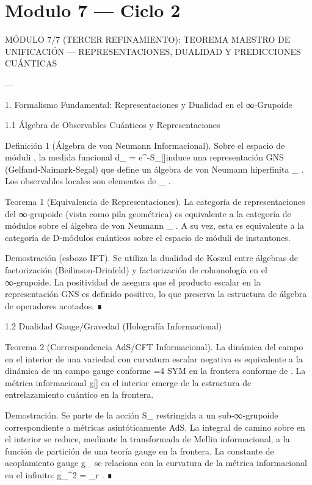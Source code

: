 \documentclass[12pt,twoside]{book}
\begin{document}
\chapter{Modulo 7 — Ciclo 2}


MÓDULO 7/7 (TERCER REFINAMIENTO): TEOREMA MAESTRO DE UNIFICACIÓN — REPRESENTACIONES, DUALIDAD Y PREDICCIONES CUÁNTICAS

---

1. Formalismo Fundamental: Representaciones y Dualidad en el ∞‑Grupoide

1.1 Álgebra de Observables Cuánticos y Representaciones

Definición 1 (Álgebra de von Neumann Informacional). Sobre el espacio de móduli   , la medida funcional  d\mu_{} = e^{-S_{}[\rho]}\rho  induce una representación GNS (Gelfand‑Naimark‑Segal) que define un álgebra de von Neumann hiperfinita  _{} . Los observables locales son elementos de  _{} .

Teorema 1 (Equivalencia de Representaciones). La categoría de representaciones del ∞‑grupoide    (vista como pila geométrica) es equivalente a la categoría de módulos sobre el álgebra de von Neumann  _{} . A su vez, esta es equivalente a la categoría de D‑módulos cuánticos sobre el espacio de móduli de instantones.

Demostración (esbozo IFT). Se utiliza la dualidad de Koszul entre álgebras de factorización (Beilinson‑Drinfeld) y factorización de cohomología en el ∞‑grupoide. La positividad de  \rho  asegura que el producto escalar en la representación GNS es definido positivo, lo que preserva la estructura de álgebra de operadores acotados. ∎

1.2 Dualidad Gauge/Gravedad (Holografía Informacional)

Teorema 2 (Correspondencia AdS/CFT Informacional). La dinámica del campo  \rho  en el interior de una variedad    con curvatura escalar negativa es equivalente a la dinámica de un campo gauge conforme  =4  SYM en la frontera conforme de   . La métrica informacional  g[\rho]  en el interior emerge de la estructura de entrelazamiento cuántico en la frontera.

Demostración. Se parte de la acción  S_{}  restringida a un sub‑∞‑grupoide correspondiente a métricas asintóticamente AdS. La integral de camino sobre  \rho  en el interior se reduce, mediante la transformada de Mellin informacional, a la función de partición de una teoría gauge en la frontera. La constante de acoplamiento gauge  g_{}  se relaciona con la curvatura de la métrica informacional en el infinito:  g_{}^2 = \lim_{r\to\infty}  . ∎
\end{document}

